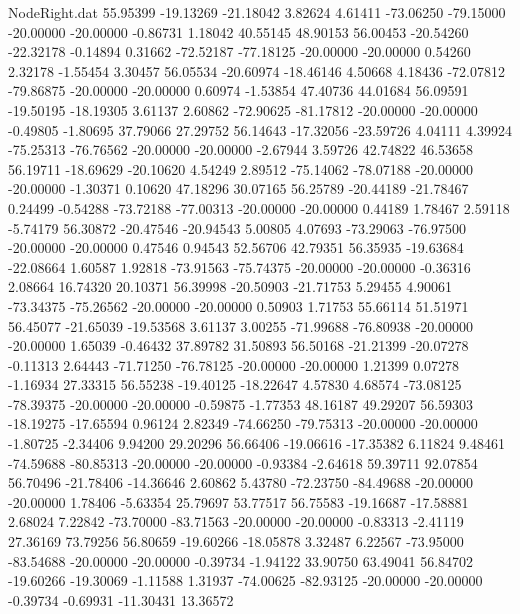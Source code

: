 \begin{filecontents}{NodeRight.dat}
  55.95399  -19.13269  -21.18042     3.82624    4.61411  -73.06250  -79.15000  -20.00000  -20.00000   -0.86731    1.18042   40.55145   48.90153
  56.00453  -20.54260  -22.32178    -0.14894    0.31662  -72.52187  -77.18125  -20.00000  -20.00000    0.54260    2.32178   -1.55454    3.30457
  56.05534  -20.60974  -18.46146     4.50668    4.18436  -72.07812  -79.86875  -20.00000  -20.00000    0.60974   -1.53854   47.40736   44.01684
  56.09591  -19.50195  -18.19305     3.61137    2.60862  -72.90625  -81.17812  -20.00000  -20.00000   -0.49805   -1.80695   37.79066   27.29752
  56.14643  -17.32056  -23.59726     4.04111    4.39924  -75.25313  -76.76562  -20.00000  -20.00000   -2.67944    3.59726   42.74822   46.53658
  56.19711  -18.69629  -20.10620     4.54249    2.89512  -75.14062  -78.07188  -20.00000  -20.00000   -1.30371    0.10620   47.18296   30.07165
  56.25789  -20.44189  -21.78467     0.24499   -0.54288  -73.72188  -77.00313  -20.00000  -20.00000    0.44189    1.78467    2.59118   -5.74179
  56.30872  -20.47546  -20.94543     5.00805    4.07693  -73.29063  -76.97500  -20.00000  -20.00000    0.47546    0.94543   52.56706   42.79351
  56.35935  -19.63684  -22.08664     1.60587    1.92818  -73.91563  -75.74375  -20.00000  -20.00000   -0.36316    2.08664   16.74320   20.10371
  56.39998  -20.50903  -21.71753     5.29455    4.90061  -73.34375  -75.26562  -20.00000  -20.00000    0.50903    1.71753   55.66114   51.51971
  56.45077  -21.65039  -19.53568     3.61137    3.00255  -71.99688  -76.80938  -20.00000  -20.00000    1.65039   -0.46432   37.89782   31.50893
  56.50168  -21.21399  -20.07278    -0.11313    2.64443  -71.71250  -76.78125  -20.00000  -20.00000    1.21399    0.07278   -1.16934   27.33315
  56.55238  -19.40125  -18.22647     4.57830    4.68574  -73.08125  -78.39375  -20.00000  -20.00000   -0.59875   -1.77353   48.16187   49.29207
  56.59303  -18.19275  -17.65594     0.96124    2.82349  -74.66250  -79.75313  -20.00000  -20.00000   -1.80725   -2.34406    9.94200   29.20296
  56.66406  -19.06616  -17.35382     6.11824    9.48461  -74.59688  -80.85313  -20.00000  -20.00000   -0.93384   -2.64618   59.39711   92.07854
  56.70496  -21.78406  -14.36646     2.60862    5.43780  -72.23750  -84.49688  -20.00000  -20.00000    1.78406   -5.63354   25.79697   53.77517
  56.75583  -19.16687  -17.58881     2.68024    7.22842  -73.70000  -83.71563  -20.00000  -20.00000   -0.83313   -2.41119   27.36169   73.79256
  56.80659  -19.60266  -18.05878     3.32487    6.22567  -73.95000  -83.54688  -20.00000  -20.00000   -0.39734   -1.94122   33.90750   63.49041
  56.84702  -19.60266  -19.30069    -1.11588    1.31937  -74.00625  -82.93125  -20.00000  -20.00000   -0.39734   -0.69931  -11.30431   13.36572

\end{filecontents}
